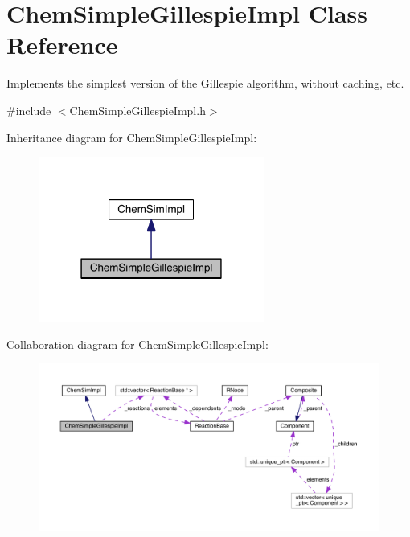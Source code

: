 \hypertarget{classChemSimpleGillespieImpl}{\section{Chem\+Simple\+Gillespie\+Impl Class Reference}
\label{classChemSimpleGillespieImpl}
}


Implements the simplest version of the Gillespie algorithm, without caching, etc.  




{\ttfamily \#include $<$Chem\+Simple\+Gillespie\+Impl.\+h$>$}



Inheritance diagram for Chem\+Simple\+Gillespie\+Impl\+:\nopagebreak
\begin{figure}[H]
\begin{center}
\leavevmode
\includegraphics[width=210pt]{classChemSimpleGillespieImpl__inherit__graph}
\end{center}
\end{figure}


Collaboration diagram for Chem\+Simple\+Gillespie\+Impl\+:
\nopagebreak
\begin{figure}[H]
\begin{center}
\leavevmode
\includegraphics[width=350pt]{classChemSimpleGillespieImpl__coll__graph}
\end{center}
\end{figure}
